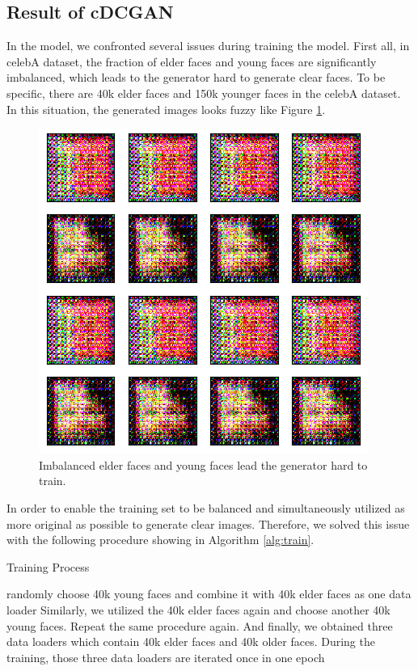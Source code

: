 \documentclass{article}
\begin{document}
\subsection{Result of cDCGAN}
In the model, we confronted several issues during training the model. First all, in celebA dataset, the fraction of elder faces and young faces are significantly imbalanced, which leads to the generator hard to generate clear faces. To be specific, there are 40k elder faces and 150k younger faces in the celebA dataset. In this situation, the generated images looks fuzzy like Figure \ref{figure: fuzzy}.
\begin{figure}[H]
\begin{center}
  \centering
  \includegraphics[scale=0.6]{image/fuzzy.png}
\end{center}
\caption{Imbalanced elder faces and young faces lead the generator hard to train.}
\label{figure: fuzzy}
\end{figure}
In order to enable the training set to be balanced and simultaneously utilized as more original as possible to generate clear images. Therefore, we solved this issue with the following procedure showing in Algorithm \ref{alg:train}.
\begin{algorithm}
        \caption{Training Process}
        \label{alg:train}
        \begin{algorithmic}[1]
             \State randomly choose 40k young faces and combine it with 40k elder faces as one data loader
             \State Similarly, we utilized the 40k elder faces again and choose another 40k young faces. Repeat the same procedure again. And finally, we obtained three data loaders which contain 40k elder faces and 40k older faces.
             \State During the training, those three data loaders are iterated once in one epoch
        \end{algorithmic}
\end{algorithm}
\end{document}
